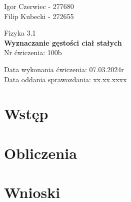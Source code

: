 \documentclass[11pt]{article}
\begin{document}
    \begin{flushright}
        \large{
            Igor Czerwiec - 277680\\
            Filip Kubecki - 272655
        }\\
    \end{flushright}
    \begin{center}
        \large{Fizyka 3.1}\\
        \vspace{2mm}
        \LARGE{\textbf{Wyznaczanie gęstości ciał stałych}}\\
        \vspace{3mm}
        \huge{Nr ćwiczenia: 100b}\\
        \vspace{1cm}
    \end{center}
    \begin{flushright}
        \large{
            Data wykonania ćwiczenia: 07.03.2024r\\
            Data oddania sprawozdania: xx.xx.xxxx
        }\\
    \end{flushright}

    \section{Wstęp}

    \section{Obliczenia}

    \section{Wnioski}
\end{document}
